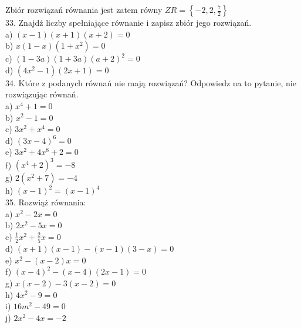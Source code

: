 \documentclass[10pt]{article}
\begin{document}
Zbiór rozwiązań równania jest zatem równy \(Z R=\left\{-2,2, \frac{7}{2}\right\}\)\\
33. Znajdź liczby spełniające równanie i zapisz zbiór jego rozwiązań.\\
a) \((x-1)(x+1)(x+2)=0\)\\
b) \(x(1-x)\left(1+x^{2}\right)=0\)\\
c) \((1-3 a)(1+3 a)(a+2)^{2}=0\)\\
d) \(\left(4 x^{2}-1\right)(2 x+1)=0\)\\
34. Które z podanych równań nie mają rozwiązań? Odpowiedz na to pytanie, nie rozwiązując równań.\\
a) \(x^{4}+1=0\)\\
b) \(x^{2}-1=0\)\\
c) \(3 x^{2}+x^{4}=0\)\\
d) \((3 x-4)^{6}=0\)\\
e) \(3 x^{2}+4 x^{8}+2=0\)\\
f) \(\left(x^{4}+2\right)^{3}=-8\)\\
g) \(2\left(x^{2}+7\right)=-4\)\\
h) \((x-1)^{2}=(x-1)^{4}\)\\
35. Rozwiąż równania:\\
a) \(x^{2}-2 x=0\)\\
b) \(2 x^{2}-5 x=0\)\\
c) \(\frac{1}{2} x^{2}+\frac{2}{5} x=0\)\\
d) \((x+1)(x-1)-(x-1)(3-x)=0\)\\
e) \(x^{2}-(x-2) x=0\)\\
f) \((x-4)^{2}-(x-4)(2 x-1)=0\)\\
g) \(x(x-2)-3(x-2)=0\)\\
h) \(4 x^{2}-9=0\)\\
i) \(16 m^{2}-49=0\)\\
j) \(2 x^{2}-4 x=-2\)
\end{document}
